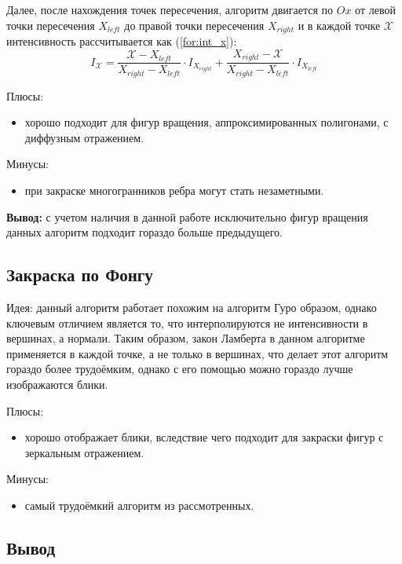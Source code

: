 Далее, после нахождения точек пересечения, алгоритм двигается по $Ox$ от левой точки пересечения $X_{left}$ до правой точки пересечения $X_{right}$ и в каждой точке $\mathcal{X}$ интенсивность рассчитывается как (\ref{for:int_x}):
\begin{equation}
    \label{for:int_x}
    I_{\mathcal{X}} = \frac{\mathcal{X} - X_{left}}{X_{right} - X_{left}} \cdot I_{X_{right}} + \frac{X_{right} - \mathcal{X}}{X_{right} - X_{left}} \cdot I_{X_{left}}
\end{equation}

Плюсы:
\begin{itemize}
    \item хорошо подходит для фигур вращения, аппроксимированных полигонами, с диффузным отражением.
\end{itemize}

Минусы:
\begin{itemize}
    \item при закраске многогранников ребра могут стать незаметными.
\end{itemize}

\textbf{Вывод:} с учетом наличия в данной работе исключительно фигур вращения данных алгоритм подходит гораздо больше предыдущего.


\subsection{Закраска по Фонгу}
Идея: данный алгоритм работает похожим на алгоритм Гуро образом, однако ключевым отличием является то, что интерполируются не интенсивности в вершинах, а нормали. Таким образом, закон Ламберта в данном алгоритме применяется в каждой точке, а не только в вершинах, что делает этот алгоритм гораздо более трудоёмким, однако с его помощью можно гораздо лучше изображаются блики.

Плюсы:
\begin{itemize}
    \item хорошо отображает блики, вследствие чего подходит для закраски фигур с зеркальным отражением.
\end{itemize}

Минусы:
\begin{itemize}
    \item самый трудоёмкий алгоритм из рассмотренных.
\end{itemize}

\subsection*{Вывод}

